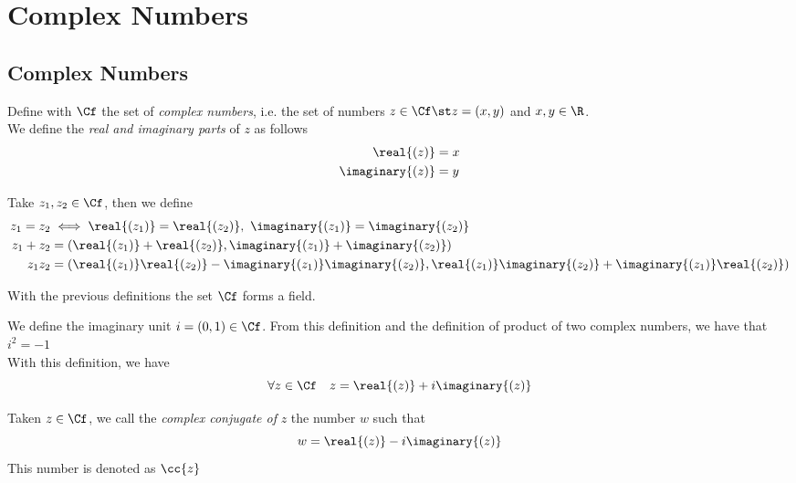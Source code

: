 \documentclass[../mmf.tex]{subfiles}
\begin{document}
\chapter{Complex Numbers}
\section{Complex Numbers}
\begin{dfn}
	Define with $\Cf$ the set of \textit{complex numbers}, i.e. the set of numbers $z\in\Cf\st z=(x,y)$ and $x,y\in\R$.\\
	We define the \textit{real and imaginary parts} of $z$ as follows
	\begin{equation}
		\begin{aligned}
			\real{(z)}&=x\\
			\imaginary{(z)}&=y
		\end{aligned}
		\label{eq:realimaginarypart}
	\end{equation}
\end{dfn}
\begin{dfn}[Operations in $\Cf$]
	Take $z_1,z_2\in\Cf$, then we define
	\begin{equation*}
		\begin{aligned}
			z_1=z_2&\iff \real{(z_1)}=\real{(z_2)},\ \imaginary{(z_1)}=\imaginary{(z_2)}\\
			z_1+z_2&=(\real{(z_1)}+\real{(z_2)},\imaginary{(z_1)}+\imaginary{(z_2)})\\
			z_1z_2&=(\real{(z_1)}\real{(z_2)}-\imaginary{(z_1)}\imaginary{(z_2)},\real{(z_1)}\imaginary{(z_2)}+\imaginary{(z_1)}\real{(z_2)})
		\end{aligned}
	\end{equation*}
\end{dfn}
\begin{thm}
	With the previous definitions the set $\Cf$ forms a field.
\end{thm}
\begin{dfn}
	We define the imaginary unit $i=(0,1)\in\Cf$. From this definition and the definition of product of two complex numbers, we have that $i^2=-1$\\
	With this definition, we have
	\begin{equation}
		\forall z\in\Cf\quad z=\real{(z)}+i\imaginary{(z)}
		\label{eq:complex}
	\end{equation}
\end{dfn}
\begin{dfn}
	Taken $z\in\Cf$, we call the \textit{complex conjugate of} $z$ the number $w$ such that
	\begin{equation}
		w=\real{(z)}-i\imaginary{(z)}
		\label{eq:complexcon}
	\end{equation}
	This number is denoted as $\cc{z}$
\end{dfn}
\end{document}
